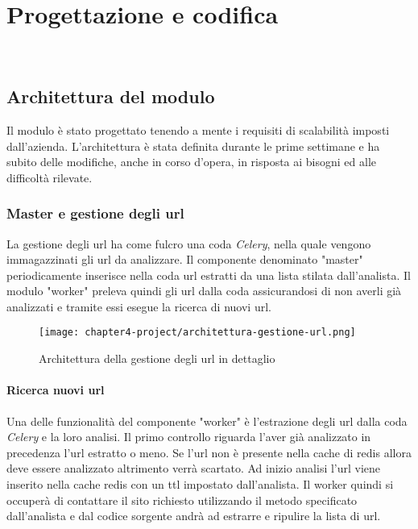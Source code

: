 
\chapter{Progettazione e codifica}
\label{cap:progettazione-codifica}

\\

\section{Architettura del modulo}

Il modulo è stato progettato tenendo a mente i requisiti di scalabilità imposti dall'azienda. L'architettura è stata definita durante le prime settimane e ha subito delle modifiche, anche in corso d'opera, in risposta ai bisogni ed alle difficoltà rilevate.

\subsection{Master e gestione degli url}

La gestione degli url ha come fulcro una coda \emph{Celery}, nella quale vengono immagazzinati gli url da analizzare. Il componente denominato "master" periodicamente inserisce nella coda url estratti da una lista stilata dall'analista. Il modulo "worker" preleva quindi gli url dalla coda assicurandosi di non averli già analizzati e tramite essi esegue la ricerca di nuovi url. 


\begin{figure}[!h] 
    \centering 
    \texttt{[image: chapter4-project/architettura-gestione-url.png]} 
    \caption{Architettura della gestione degli url in dettaglio}
\end{figure}
\newpage{}

\subsubsection{Ricerca nuovi url}
Una delle funzionalità del componente "worker" è l'estrazione degli url dalla coda \emph{Celery} e la loro analisi. Il primo controllo riguarda l'aver già analizzato in precedenza l'url estratto o meno. Se l'url non è presente nella cache di redis allora deve essere analizzato altrimento verrà scartato. Ad inizio analisi l'url viene inserito nella cache redis con un \gls{ttl} impostato dall'analista. Il worker quindi si occuperà di contattare il sito richiesto utilizzando il metodo specificato dall'analista e dal codice sorgente andrà ad estrarre e ripulire la lista di url. 


